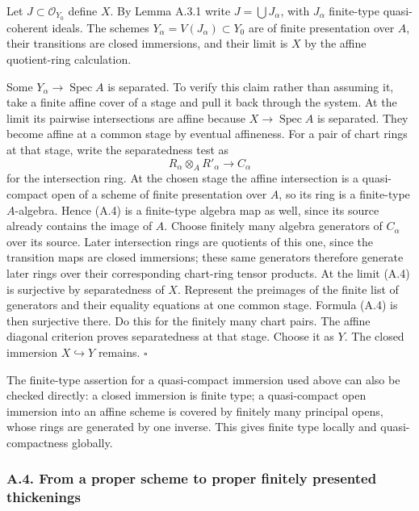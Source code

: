 \documentclass[11pt]{article}
\begin{document}
Let \(J\subset\mathcal O_{Y_0}\) define \(X\). By Lemma A.3.1 write
\(J=\bigcup J_\alpha\), with \(J_\alpha\) finite-type quasi-coherent
ideals. The schemes \(Y_\alpha=V(J_\alpha)\subset Y_0\) are of finite
presentation over \(A\), their transitions are closed immersions, and
their limit is \(X\) by the affine quotient-ring calculation.

Some \(Y_\alpha\to\operatorname{Spec}A\) is separated. To verify this
claim rather than assuming it, take a finite affine cover of a stage and
pull it back through the system. At the limit its pairwise intersections
are affine because \(X\to\operatorname{Spec}A\) is separated. They
become affine at a common stage by eventual affineness. For a pair of
chart rings at that stage, write the separatedness test as \[
R_\alpha\otimes_A R'_\alpha\longrightarrow C_\alpha
\tag{A.4}
\] for the intersection ring. At the chosen stage the affine
intersection is a quasi-compact open of a scheme of finite presentation
over \(A\), so its ring is a finite-type \(A\)-algebra. Hence (A.4) is a
finite-type algebra map as well, since its source already contains the
image of \(A\). Choose finitely many algebra generators of \(C_\alpha\)
over its source. Later intersection rings are quotients of this one,
since the transition maps are closed immersions; these same generators
therefore generate later rings over their corresponding chart-ring
tensor products. At the limit (A.4) is surjective by separatedness of
\(X\). Represent the preimages of the finite list of generators and
their equality equations at one common stage. Formula (A.4) is then
surjective there. Do this for the finitely many chart pairs. The affine
diagonal criterion proves separatedness at that stage. Choose it as
\(Y\). The closed immersion \(X\hookrightarrow Y\) remains. \(\square\)

The finite-type assertion for a quasi-compact immersion used above can
also be checked directly: a closed immersion is finite type; a
quasi-compact open immersion into an affine scheme is covered by
finitely many principal opens, whose rings are generated by one inverse.
This gives finite type locally and quasi-compactness globally.

\subsubsection{A.4. From a proper scheme to proper finitely presented
thickenings}\label{a.4.-from-a-proper-scheme-to-proper-finitely-presented-thickenings}
\end{document}
